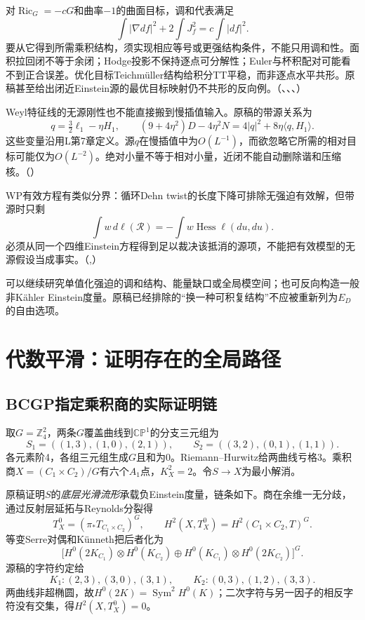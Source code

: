 \documentclass[UTF8,fontset=fandol,zihao=-4]{ctexart}
\theoremstyle{research}
\DeclareMathOperator{\Ric}{Ric}
\DeclareMathOperator{\Hess}{Hess}
\newcommand{\Z}{\mathbb Z}
\newcommand{\CP}{\mathbb{CP}}
\numberwithin{equation}{section}
\begin{document}
对$\Ric_G=-cG$和曲率$-1$的曲面目标，调和代表满足
\[
\int|\nabla df|^2+2\int J_f^2=c\int|df|^2.
\]
要从它得到所需乘积结构，须实现相应等号或更强结构条件，不能只用调和性。面积拉回闭不等于余闭；Hodge投影不保持逐点可分解性；Euler与杯积配对可能看不到正合误差。优化目标Teichmüller结构给积分TT平稳，而非逐点水平共形。原稿甚至给出闭近Einstein源的最优目标映射仍不共形的反向例。\cite{L}（、、、）

Weyl特征线的无源刚性也不能直接搬到慢插值输入。原稿的带源关系为
\[
q=\tfrac32\ell_1-\eta H_1,
\qquad (9+4\eta^2)D-4\eta^2N=4|q|^2+8\eta\langle q,H_1\rangle.
\]
这些变量沿用L第7章定义。源$q$在慢插值中为$O(L^{-1})$，而欲忽略它所需的相对目标可能仅为$O(L^{-2})$。绝对小量不等于相对小量，近闭不能自动删除谐和压缩核。\cite{L}（）

WP有效方程有类似分界：循环Dehn twist的长度下降可排除无强迫有效解，但带源时只剩
\[
\int w\,d\ell(\mathcal R)=-\int w\Hess\ell(du,du).
\]
必须从同一个四维Einstein方程得到足以裁决该抵消的源项，不能把有效模型的无源假设当成事实。\cite{L}（,）

可以继续研究单值化强迫的调和结构、能量缺口或全局模空间；也可反向构造一般非Kähler Einstein度量。原稿已经排除的“换一种可积复结构”不应被重新列为$E_D$的自由选项。

\section{代数平滑：证明存在的全局路径}
\subsection{BCGP指定乘积商的实际证明链}
取$G=\Z_4^2$，两条$G$覆盖曲线到$\CP^1$的分支三元组为
\[
S_1=((1,3),(1,0),(2,1)),\qquad
S_2=((3,2),(0,1),(1,1)).
\]
各元素阶4，各组三元组生成$G$且和为0。Riemann--Hurwitz给两曲线亏格3。乘积商$X=(C_1\times C_2)/G$有六个$A_1$点，$K_X^2=2$。令$S\to X$为最小解消。

原稿证明$S$的\emph{底层光滑流形}承载负Einstein度量，链条如下。商在余维一无分歧，通过反射层延拓与Reynolds分裂得
\[
T_X^0=(\pi_*T_{C_1\times C_2})^G,
\qquad H^2(X,T_X^0)=H^2(C_1\times C_2,T)^G.
\]
等变Serre对偶和Künneth把后者化为
\[
\bigl[H^0(2K_{C_1})\otimes H^0(K_{C_2})
\oplus H^0(K_{C_1})\otimes H^0(2K_{C_2})\bigr]^G.
\]
源稿的字符约定给
\[
K_1:(2,3),(3,0),(3,1),\qquad
K_2:(0,3),(1,2),(3,3).
\]
两曲线非超椭圆，故$H^0(2K)=\operatorname{Sym}^2H^0(K)$；二次字符与另一因子的相反字符没有交集，得$H^2(X,T_X^0)=0$。
\end{document}
